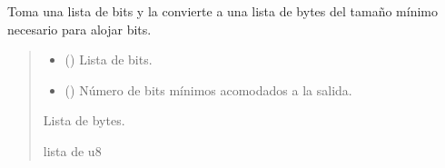 \documentclass[letterpaper,10pt,english]{sphinxmanual}
\begin{document}
\begin{fulllineitems}
\label{\detokenize{fpga.interfaz_pcps:fpga.interfaz_pcps.bitstr_to_bytestr}}
\pysigstartsignatures
{}
\pysigstopsignatures
\sphinxAtStartPar
Toma una lista de bits  y la convierte a una lista de bytes del tamaño mínimo necesario para alojar  bits.
\begin{quote}\begin{description}
\begin{itemize}
\item {} 
\sphinxAtStartPar
{} (\sphinxstyleliteralemphasis{\sphinxupquote{,}}) \textendash{} Lista de bits.

\item {} 
\sphinxAtStartPar
{} () \textendash{} Número de bits mínimos acomodados a la salida.

\end{itemize}

\sphinxAtStartPar
Lista de bytes.

\sphinxAtStartPar
lista de u8

\end{description}\end{quote}

\end{fulllineitems}

\end{document}
